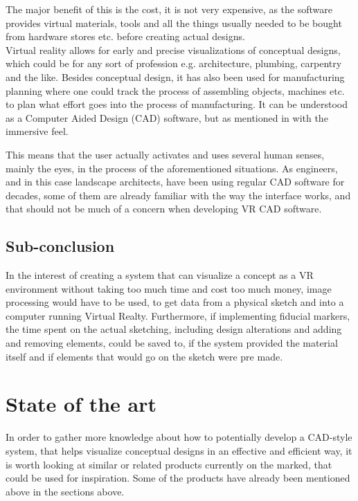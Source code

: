 	The major benefit of this is the cost, it is not very expensive, as the software provides virtual materials, tools and all the things usually needed to be bought from hardware stores etc. before creating actual designs. \\ 
	
	Virtual reality allows for early and precise visualizations of conceptual designs, which could be for any sort of profession e.g. architecture, plumbing, carpentry and the like. Besides conceptual design, it has also been used for manufacturing planning where one could track the process of assembling objects, machines etc. to plan what effort goes into the process of manufacturing. It can be understood as a Computer Aided Design (CAD) software, but as mentioned in \cite{engineeringVR} with the immersive feel. 
	
	This means that the user actually activates and uses several human senses, mainly the eyes, in the process of the aforementioned situations. As engineers, and in this case landscape architects, have been using regular CAD software for decades, some of them are already familiar with the way the interface works, and that should not be much of a concern when developing VR CAD software.

	\subsection{Sub-conclusion}
	In the interest of creating a system that can visualize a concept as a VR environment without taking too much time and cost too much money, image processing would have to be used, to get data from a physical sketch and into a computer running Virtual Realty. Furthermore, if implementing fiducial markers, the time spent on the actual sketching, including design alterations and adding and removing elements, could be saved to, if the system provided the material itself and if elements that would go on the sketch were pre made.

    \section{State of the art}\label{sec:SOTA}
    In order to gather more knowledge about how to potentially develop a CAD-style system, that helps visualize conceptual designs in an effective and efficient way, it is worth looking at similar or related products currently on the marked, that could be used for inspiration. Some of the products have already been mentioned above in the sections above.
	  
